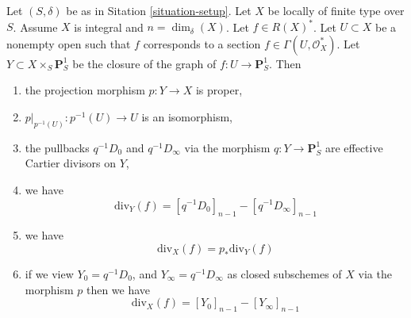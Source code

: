 \begin{lemma}
\label{lemma-rational-function}
Let $(S, \delta)$ be as in Sitation \ref{situation-setup}.
Let $X$ be locally of finite type over $S$. Assume $X$ is
integral and $n = \dim_\delta(X)$. Let $f \in R(X)^*$.
Let $U \subset X$ be a nonempty open such that $f$
corresponds to a section $f \in \Gamma(U, \mathcal{O}_X^*)$.
Let $Y \subset X \times_S \mathbf{P}^1_S$ be the
closure of the graph of $f : U \to \mathbf{P}^1_S$.
Then
\begin{enumerate}
\item the projection morphism $p : Y \to X$ is proper,
\item $p|_{p^{-1}(U)} : p^{-1}(U) \to U$ is an isomorphism,
\item the pullbacks $q^{-1}D_0$ and $q^{-1}D_\infty$ via the morphism
$q : Y \to \mathbf{P}^1_S$ are effective Cartier divisors on $Y$,
\item we have
$$
\text{div}_Y(f) = [q^{-1}D_0]_{n - 1} - [q^{-1}D_\infty]_{n - 1}
$$
\item we have
$$
\text{div}_X(f) = p_*\text{div}_Y(f)
$$
\item if we view $Y_0 = q^{-1}D_0$, and
$Y_\infty = q^{-1}D_\infty$ as closed subschemes of $X$
via the morphism $p$ then we have
$$
\text{div}_X(f) = [Y_0]_{n - 1} - [Y_\infty]_{n - 1}
$$
\end{enumerate}
\end{lemma}

